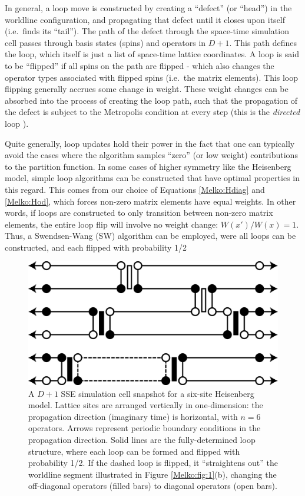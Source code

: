 \documentclass[vecphys]{svmult}
\begin{document}
In general, a loop move is constructed by creating a ``defect'' (or ``head'') in the worldline configuration, and propagating that defect until it closes upon itself (i.e.~finds its ``tail'').  The path of the defect through the space-time simulation cell passes through basis states (spins) and operators in $D+1$.  This path defines the loop, which itself is just a list of space-time lattice coordinates.  A loop is said to be ``flipped'' if all spins on the path are flipped - which also changes the operator types associated with flipped spins (i.e.~the matrix elements).
This loop flipping generally accrues some change in weight.  These weight changes can be absorbed into the process of creating the loop path, such that the propagation of the defect is subject to the Metropolis condition at every step (this is the {\em directed} loop \cite{Melko:Syljuasen02}).  

Quite generally, loop updates hold their power in the fact that one can typically avoid the cases where the algorithm samples ``zero'' (or low weight) contributions to the partition function.  In some cases of higher symmetry like the Heisenberg model, simple loop algorithms can be constructed that have optimal properties in this regard.  This comes from our choice of Equations \ref{Melko:Hdiag} and \ref{Melko:Hod}, which forces non-zero matrix elements have equal weights.  In other words, if loops are constructed to only transition between non-zero matrix elements, the entire loop flip will involve no weight change: $W(x')/W(x) = 1$.  Thus, a Swendsen-Wang (SW) algorithm can be employed, were
all loops can be constructed, and each flipped with probability 1/2 \cite{Melko:Swendsen88} 

\begin{figure}[t]
\centering
\includegraphics*[width=.9\textwidth]{finiteT_heis.eps}
\caption[]{A $D+1$ SSE simulation cell snapshot for a six-site Heisenberg model.  Lattice sites are arranged vertically in one-dimension: the propagation direction (imaginary time) is horizontal, with $n=6$ operators.  Arrows represent periodic boundary conditions in the propagation direction.  Solid lines are the fully-determined loop structure, where each loop can be formed and flipped with probability 1/2.  If the dashed loop is flipped, it ``straightens out'' the worldline segment illustrated in Figure \ref{Melko:fig:1}(b), changing the off-diagonal operators (filled bars) to diagonal operators (open bars).}
\label{Melko:fig:2}       %
\end{figure} 
\end{document}
